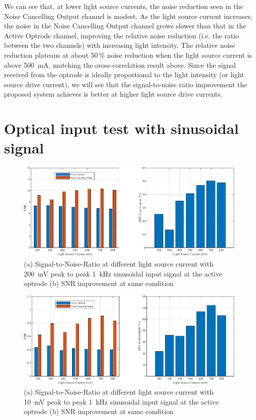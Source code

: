 We can see that, at lower light source currents, the noise reduction seen in the Noise Cancelling Output channel is modest.  As the light source current increases, the noise in the Noise Cancelling Output channel grows slower than that in the Active Optrode channel, improving the relative noise reduction (i.e. the ratio between the two channels) with increasing light intensity.  The relative noise reduction plateaus at about 50\,\% noise reduction when the light source current is above \qty{500}{mA}, matching the cross-correlation result above.  Since the signal received from the optrode is ideally proportional to the light intensity (or light source drive current), we will see that the signal-to-noise ratio improvement the proposed system achieves is better at higher light source drive currents. 

\section{Optical input test with sinusoidal signal}

\begin{figure}[H]
\centerline{\includegraphics[width=1\linewidth]{5-Experiment/SNR (200mV input).pdf}}
\caption{(a) Signal-to-Noise-Ratio at different light source current with \qty{200}{\mV} peak to peak \qty{1}{\kHz} sinusoidal input signal at the active optrode (b) SNR improvement at same condition}
\label{fig_SNR (200mV input)}
\end{figure}

\begin{figure}[H]
\centerline{\includegraphics[width=1\linewidth]{5-Experiment/SNR (10mV input).pdf}}
\caption{(a) Signal-to-Noise-Ratio at different light source current with \qty{10}{\mV} peak to peak \qty{1}{\kHz} sinusoidal input signal at the active optrode (b) SNR improvement at same condition}
\label{fig_SNR (10mV input)}
\end{figure}

